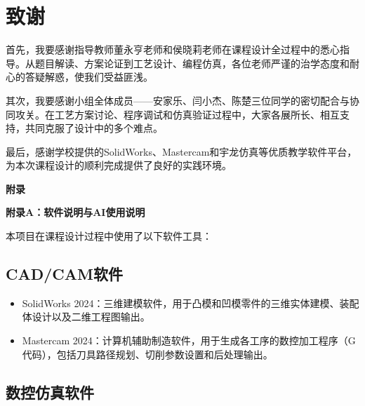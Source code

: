 \documentclass{xautCADreport}
\begin{document}

\newpage
{}
\section*{致谢}

首先，我要感谢指导教师董永亨老师和侯晓莉老师在课程设计全过程中的悉心指导。从题目解读、方案论证到工艺设计、编程仿真，各位老师严谨的治学态度和耐心的答疑解惑，使我们受益匪浅。

其次，我要感谢小组全体成员——安家乐、闫小杰、陈楚三位同学的密切配合与协同攻关。在工艺方案讨论、程序调试和仿真验证过程中，大家各展所长、相互支持，共同克服了设计中的多个难点。

最后，感谢学校提供的SolidWorks、Mastercam和宇龙仿真等优质教学软件平台，为本次课程设计的顺利完成提供了良好的实践环境。


\newpage
{}
\appendix
\renewcommand{\thesection}{}

{\centering\LARGE\bfseries 附录\par\vspace{1em}}

{\centering\LARGE\bfseries 附录A：软件说明与AI使用说明\par\vspace{0.8em}}

本项目在课程设计过程中使用了以下软件工具：

\subsection*{CAD/CAM软件}

\begin{itemize}
  \item SolidWorks 2024：三维建模软件，用于凸模和凹模零件的三维实体建模、装配体设计以及二维工程图输出。
  \item Mastercam 2024：计算机辅助制造软件，用于生成各工序的数控加工程序（G代码），包括刀具路径规划、切削参数设置和后处理输出。
\end{itemize}

\subsection*{数控仿真软件}
\end{document}
